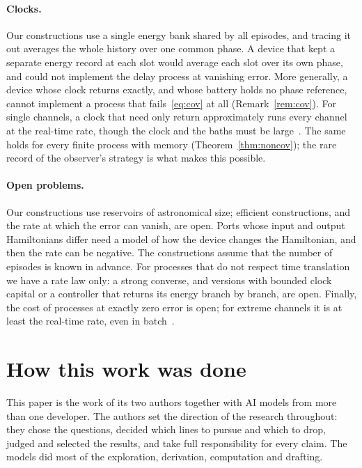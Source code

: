 \documentclass[11pt]{article}
\theoremstyle{definition}
\theoremstyle{remark}
\begin{document}
\paragraph{Clocks.} Our constructions use a single energy bank shared by all episodes, and tracing it out averages the whole history over one common phase. A device that kept a separate energy record at each slot would average each slot over its own phase, and could not implement the delay process at vanishing error. More generally, a device whose clock returns exactly, and whose battery holds no phase reference, cannot implement a process that fails~\eqref{eq:cov} at all (Remark~\ref{rem:cov}). For single channels, a clock that need only return approximately runs every channel at the real-time rate, though the clock and the baths must be large~\cite{SaveWork}. The same holds for every finite process with memory (Theorem~\ref{thm:noncov}); the rare record of the observer's strategy is what makes this possible.

\paragraph{Open problems.} Our constructions use reservoirs of astronomical size; efficient constructions, and the rate at which the error can vanish, are open. Ports whose input and output Hamiltonians differ need a model of how the device changes the Hamiltonian, and then the rate can be negative. The constructions assume that the number of episodes is known in advance. For processes that do not respect time translation we have a rate law only: a strong converse, and versions with bounded clock capital or a controller that returns its energy branch by branch, are open. Finally, the cost of processes at exactly zero error is open; for extreme channels it is at least the real-time rate, even in batch~\cite{SaveWork}.

\section*{How this work was done}
This paper is the work of its two authors together with AI models from more than one developer. The authors set the direction of the research throughout: they chose the questions, decided which lines to pursue and which to drop, judged and selected the results, and take full responsibility for every claim. The models did most of the exploration, derivation, computation and drafting.
\end{document}
